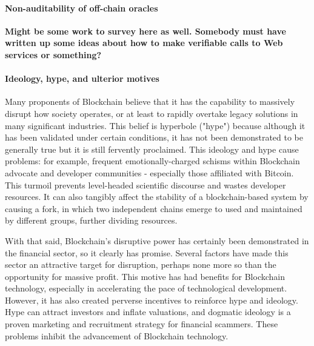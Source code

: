 {\paragraph{Non-auditability of off-chain oracles}
\textbf{Might be some work to survey here as well. Somebody must have written up some ideas about how to make verifiable calls to Web services or something?}

\paragraph{Ideology, hype, and ulterior motives}
Many proponents of Blockchain believe that it has the capability to massively disrupt how society operates, or at least to rapidly overtake legacy solutions in many significant industries. This belief is hyperbole ("hype") because although it has been validated under certain conditions, it has not been demonstrated to be generally true but it is still fervently proclaimed. This ideology and hype cause problems: for example, frequent emotionally-charged schisms within Blockchain advocate and developer communities - especially those affiliated with Bitcoin. This turmoil prevents level-headed scientific discourse and wastes developer resources. It can also tangibly affect the stability of a blockchain-based system by causing a fork, in which two independent chains emerge to used and maintained by different groups, further dividing resources.

With that said, Blockchain's disruptive power has certainly been demonstrated in the financial sector, so it clearly has promise. Several factors have made this sector an attractive target for disruption, perhaps none more so than the opportunity for massive profit. This motive has had benefits for Blockchain technology, especially in accelerating the pace of technological development. However, it has also created perverse incentives to reinforce hype and ideology. Hype can attract investors and inflate valuations, and dogmatic ideology is a proven marketing and recruitment strategy for financial scammers. These problems inhibit the advancement of Blockchain technology.

}
